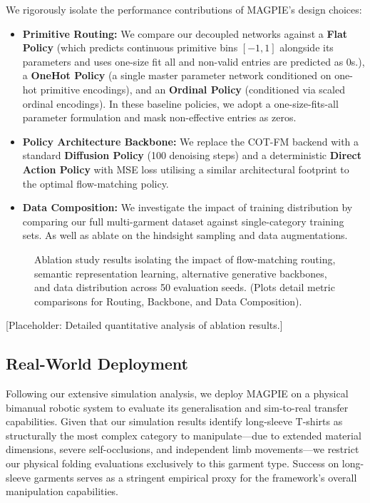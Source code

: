 \documentclass[journal]{IEEEtran}
\begin{document}
We rigorously isolate the performance contributions of MAGPIE's design choices:
\begin{itemize}
    \item \textbf{Primitive Routing:} We compare our decoupled networks against a \textbf{Flat Policy} (which predicts continuous primitive bins $[-1, 1]$ alongside its parameters and uses one-size fit all and non-valid entries are predicted as 0s.), a \textbf{OneHot Policy} (a single master parameter network conditioned on one-hot primitive encodings), and an \textbf{Ordinal Policy} (conditioned via scaled ordinal encodings). In these baseline policies, we adopt a one-size-fits-all parameter formulation and mask non-effective entries as zeros.
    \item \textbf{Policy Architecture Backbone:} We replace the COT-FM backend with a standard \textbf{Diffusion Policy} (100 denoising steps) and a deterministic \textbf{Direct Action Policy} with MSE loss utilising a similar architectural footprint to the optimal flow-matching policy.
    \item \textbf{Data Composition:} We investigate the impact of training distribution by comparing our full multi-garment dataset against single-category training sets. As well as ablate on the hindsight sampling and data augmentations.
\end{itemize}

\begin{figure}[!h]
    \centering
    \caption{Ablation study results isolating the impact of flow-matching routing, semantic representation learning, alternative generative backbones, and data distribution across 50 evaluation seeds. (Plots detail metric comparisons for Routing, Backbone, and Data Composition).}
    \label{fig:ablations}
\end{figure}

[Placeholder: Detailed quantitative analysis of ablation results.]


\subsection{Real-World Deployment}
\label{sec:exp_real_world}

Following our extensive simulation analysis, we deploy MAGPIE on a physical bimanual robotic system to evaluate its generalisation and sim-to-real transfer capabilities. Given that our simulation results identify long-sleeve T-shirts as structurally the most complex category to manipulate—due to extended material dimensions, severe self-occlusions, and independent limb movements—we restrict our physical folding evaluations exclusively to this garment type. Success on long-sleeve garments serves as a stringent empirical proxy for the framework's overall manipulation capabilities. 
\end{document}
